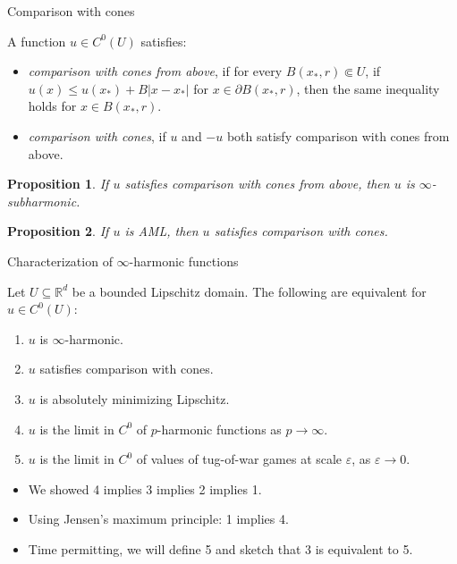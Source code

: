 \documentclass[10pt]{beamer}
\newcommand{\RR}{\mathbb{R}}
\newtheorem{proposition}{Proposition}
\begin{document}
\begin{frame}{Comparison with cones}

\begin{definition}
A function $u \in C^0(U)$ satisfies: 
\begin{itemize}
\item \emph{comparison with cones from above}, if for every $B(x_*, r) \Subset U$, if $u(x) \leq u(x_*) + B|x - x_*|$ for $x \in \partial B(x_*, r)$, then the same inequality holds for $x \in B(x_*, r)$.
\item \emph{comparison with cones}, if $u$ and $-u$ both satisfy comparison with cones from above. \pause
\end{itemize}
\end{definition}

\begin{proposition}
If $u$ satisfies comparison with cones from above, then $u$ is $\infty$-subharmonic. \pause
\end{proposition}

\begin{proposition}
If $u$ is AML, then $u$ satisfies comparison with cones.
\end{proposition}
\end{frame}

\begin{frame}{Characterization of $\infty$-harmonic functions}
\begin{theorem}
Let $U \subseteq \RR^d$ be a bounded Lipschitz domain.
The following are equivalent for $u \in C^0(U)$: 
\begin{enumerate}
\item $u$ is $\infty$-harmonic. 
\item $u$ satisfies comparison with cones. 
\item $u$ is absolutely minimizing Lipschitz. 
\item $u$ is the limit in $C^0$ of $p$-harmonic functions as $p \to \infty$. 
\item $u$ is the limit in $C^0$ of values of tug-of-war games at scale $\varepsilon$, as $\varepsilon \to 0$. \pause
\end{enumerate}
\end{theorem}
    
\begin{itemize}
    \item We showed 4 implies 3 implies 2 implies 1.
    \item Using Jensen's maximum principle: 1 implies 4.
    \item Time permitting, we will define 5 and sketch that 3 is equivalent to 5.
\end{itemize}
\end{frame}
\end{document}
